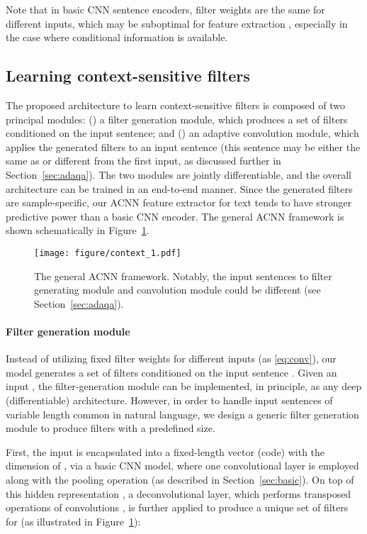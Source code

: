 \documentclass[11pt,a4paper]{article}
\begin{document}
Note that in basic CNN sentence encoders, filter weights are the same for different inputs, which may be suboptimal for feature extraction \citep{de2016dynamic}, especially in the case where conditional information is available.


\subsection{Learning context-sensitive filters} \label{sec:context}
The proposed architecture to learn context-sensitive filters is composed of two principal modules: (\emph{}) a filter generation module, which produces a set of filters conditioned on the input sentence; and (\emph{}) an adaptive convolution module, which applies the generated filters to an input sentence (this sentence may be either the same as or different from the first input, as discussed further in Section~\ref{sec:adaqa}). The two modules are jointly differentiable, and the overall architecture can be trained in an end-to-end manner. Since the generated filters are sample-specific, our ACNN feature extractor for text tends to have stronger predictive power than a basic CNN encoder. The general ACNN framework is shown schematically in Figure~\ref{fig:acnn}.

\begin{figure}
\centering
	\texttt{[image: figure/context\_1.pdf]}
	\vspace{-3mm}
	\caption{\small The general ACNN framework. Notably, the input sentences to filter generating module and convolution module could be different (see Section~\ref{sec:adaqa}).}
	\label{fig:acnn}
	\vspace{-5mm}
\end{figure}

\paragraph{Filter generation module}
Instead of utilizing fixed filter weights  for different inputs (as \eqref{eq:conv}), our model generates a set of filters conditioned on the input sentence . Given an input , the filter-generation module can be implemented, in principle, as any deep (differentiable) architecture. However, in order to handle input sentences of variable length common in natural language, we design a generic filter generation module to produce filters with a predefined size.


First, the input  is encapsulated into a fixed-length vector (code)  with the dimension of , via a basic CNN model, where one convolutional layer is employed along with the pooling operation (as described in Section~\ref{sec:basic}). On top of this hidden representation , a deconvolutional layer, which performs transposed operations of convolutions \cite{radford2015unsupervised}, is further applied to produce a unique set of filters for  (as illustrated in Figure~\ref{fig:acnn}):
\end{document}
